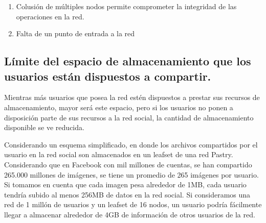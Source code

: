 \begin{enumerate}
    
    \item{Colusión de múltiples nodos permite comprometer la integridad de las operaciones en la red.}

    \item{Falta de un punto de entrada a la red}
\end{enumerate}


  \subsection{Límite del espacio de almacenamiento que los usuarios están dispuestos a compartir.}

    Mientras más usuarios que posea la red estén dispuestos a prestar sus
    recursos de almacenamiento, mayor será este espacio, pero si
    los usuarios no ponen a disposición parte de sus recursos a la red social, la
    cantidad de almacenamiento disponible se ve reducida.

    Considerando un esquema simplificado, en donde los archivos compartidos por
    el usuario en la red social son almacenados en un leafset de una red
    Pastry. Considerando que en Facebook con mil millones de cuentas, se han
    compartido 265.000 millones de imágenes, se tiene un promedio de 265 imágenes por
    usuario. Si tomamos en cuenta que cada imagen pesa alrededor de 1MB, cada
    usuario tendría subido al menos 256MB de datos en la red social.
    Si consideramos una red de 1 millón de usuarios y un leafset de 16 nodos,
    un usuario podría fácilmente llegar a almacenar alrededor de 4GB de información de otros usuarios
    de la red. 
    
